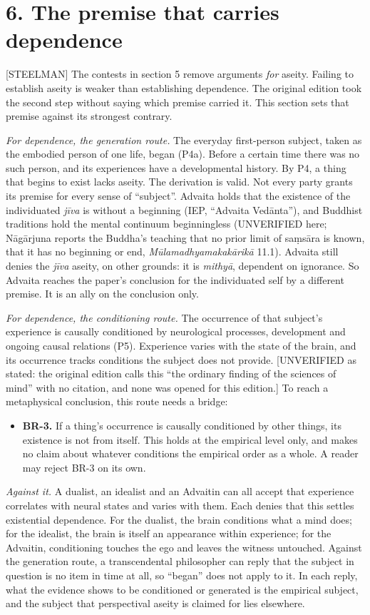 \documentclass[11pt]{article}
\newcommand{\register}[1]{{\ttfamily\small #1}}
\begin{document}
\section*{6. The premise that carries dependence}

\register{[STEELMAN]} The contests in section 5 remove arguments \emph{for} aseity. Failing to establish aseity is weaker than establishing dependence. The original edition took the second step without saying which premise carried it. This section sets that premise against its strongest contrary.

\emph{For dependence, the generation route.} The everyday first-person subject, taken as the embodied person of one life, began (P4a). Before a certain time there was no such person, and its experiences have a developmental history. By P4, a thing that begins to exist lacks aseity. The derivation is valid. Not every party grants its premise for every sense of ``subject''. Advaita holds that the existence of the individuated \emph{jīva} is without a beginning (IEP, ``Advaita Vedānta''), and Buddhist traditions hold the mental continuum beginningless (UNVERIFIED here; Nāgārjuna reports the Buddha's teaching that no prior limit of saṃsāra is known, that it has no beginning or end, \emph{Mūlamadhyamakakārikā} 11.1). Advaita still denies the \emph{jīva} aseity, on other grounds: it is \emph{mithyā}, dependent on ignorance. So Advaita reaches the paper's conclusion for the individuated self by a different premise. It is an ally on the conclusion only.

\emph{For dependence, the conditioning route.} The occurrence of that subject's experience is causally conditioned by neurological processes, development and ongoing causal relations (P5). Experience varies with the state of the brain, and its occurrence tracks conditions the subject does not provide. [UNVERIFIED as stated: the original edition calls this ``the ordinary finding of the sciences of mind'' with no citation, and none was opened for this edition.] To reach a metaphysical conclusion, this route needs a bridge:

\begin{itemize}
\item \textbf{BR-3.} If a thing's occurrence is causally conditioned by other things, its existence is not from itself. This holds at the empirical level only, and makes no claim about whatever conditions the empirical order as a whole. A reader may reject BR-3 on its own.
\end{itemize}
\emph{Against it.} A dualist, an idealist and an Advaitin can all accept that experience correlates with neural states and varies with them. Each denies that this settles existential dependence. For the dualist, the brain conditions what a mind does; for the idealist, the brain is itself an appearance within experience; for the Advaitin, conditioning touches the ego and leaves the witness untouched. Against the generation route, a transcendental philosopher can reply that the subject in question is no item in time at all, so ``began'' does not apply to it. In each reply, what the evidence shows to be conditioned or generated is the empirical subject, and the subject that perspectival aseity is claimed for lies elsewhere.
\end{document}
